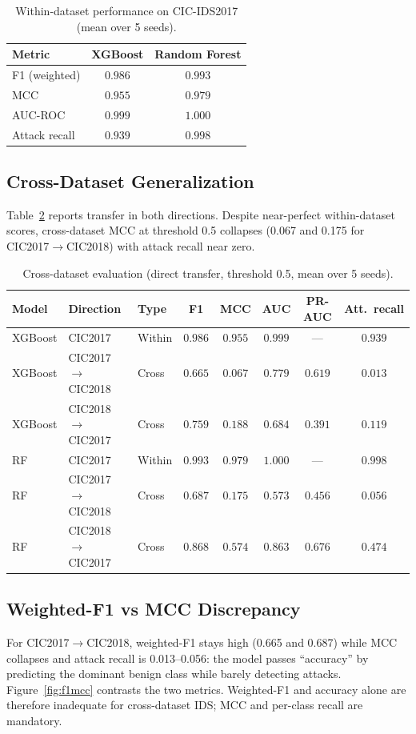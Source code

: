 \documentclass[11pt,a4paper]{article}
\begin{document}
\begin{table}[htbp]
\centering
\caption{Within-dataset performance on CIC-IDS2017 (mean over 5 seeds).}
\label{tab:within}
\footnotesize
\begin{tabular}{lcc}
\toprule
Metric & XGBoost & Random Forest \\
\midrule
F1 (weighted) & $0.986$ & $0.993$ \\
MCC           & $0.955$ & $0.979$ \\
AUC-ROC       & $0.999$ & $1.000$ \\
Attack recall & $0.939$ & $0.998$ \\
\bottomrule
\end{tabular}
\end{table}

\subsection{Cross-Dataset Generalization}
Table~\ref{tab:cross} reports transfer in both directions. Despite near-perfect
within-dataset scores, cross-dataset MCC at threshold 0.5 collapses (0.067 and 0.175 for
CIC2017$\rightarrow$CIC2018) with attack recall near zero.

\begin{table}[htbp]
\centering
\caption{Cross-dataset evaluation (direct transfer, threshold 0.5, mean over 5 seeds).}
\label{tab:cross}
\footnotesize
\begin{tabular}{lllccccc}
\toprule
Model & Direction & Type & F1 & MCC & AUC & PR-AUC & Att.\ recall \\
\midrule
XGBoost & CIC2017 & Within & $0.986$ & $0.955$ & $0.999$ & --- & $0.939$ \\
XGBoost & CIC2017$\rightarrow$CIC2018 & Cross & $0.665$ & $0.067$ & $0.779$ & $0.619$ & $0.013$ \\
XGBoost & CIC2018$\rightarrow$CIC2017 & Cross & $0.759$ & $0.188$ & $0.684$ & $0.391$ & $0.119$ \\
RF & CIC2017 & Within & $0.993$ & $0.979$ & $1.000$ & --- & $0.998$ \\
RF & CIC2017$\rightarrow$CIC2018 & Cross & $0.687$ & $0.175$ & $0.573$ & $0.456$ & $0.056$ \\
RF & CIC2018$\rightarrow$CIC2017 & Cross & $0.868$ & $0.574$ & $0.863$ & $0.676$ & $0.474$ \\
\bottomrule
\end{tabular}
\end{table}

\subsection{Weighted-F1 vs MCC Discrepancy}
For CIC2017$\rightarrow$CIC2018, weighted-F1 stays high (0.665 and 0.687) while MCC collapses
and attack recall is 0.013--0.056: the model passes ``accuracy'' by predicting the dominant
benign class while barely detecting attacks. Figure~\ref{fig:f1mcc} contrasts the two
metrics. Weighted-F1 and accuracy alone are therefore inadequate for cross-dataset IDS;
MCC and per-class recall are mandatory.
\end{document}
